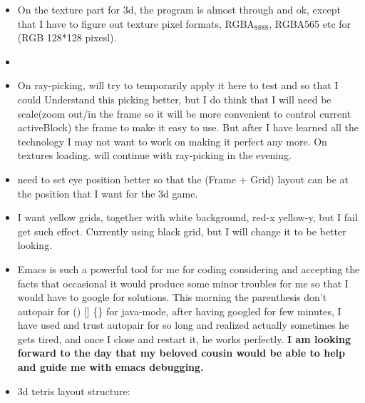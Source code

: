 \documentclass[9pt,b5paper]{article}
\begin{document}
\begin{itemize}
\item On the texture part for 3d, the program is almost through and ok, except that I have to figure out texture pixel formats, RGBA$_{\text{8888}}$, RGBA565 etc for (RGB 128*128 pixesl).
\item 
\item On ray-picking, will try to temporarily apply it here to test and so that I could Understand this picking better, but I do think that I will need be scale(zoom out/in the frame so it will be more convenient to control current activeBlock) the frame to make it easy to use. But after I have learned all the technology I may not want to work on making it perfect any more. On textures loading. will continue with ray-picking in the evening.
\item need to set eye position better so that the (Frame + Grid) layout can be at the position that I want for the 3d game.
\item I want yellow grids, together with white background, red-x yellow-y, but I fail get such effect. Currently using black grid, but I will change it to be better looking.
\item Emacs is such a powerful tool for me for coding considering and accepting the facts that occasional it would produce some minor troubles for me so that I would have to google for solutions. This morning the parenthesis don't autopair for () [] \{\} for java-mode, after having googled for few minutes, I have used and trust autopair for so long and realized actually sometimes he gets tired, and once I close and restart it, he works perfectly. \textbf{I am looking forward to the day that my beloved cousin would be able to help and guide me with emacs debugging.}
\item 3d tetris layout structure:


\end{itemize}
\end{document}
